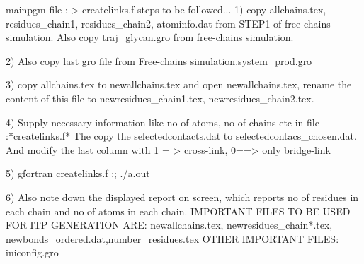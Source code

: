 mainpgm file :-> createlinks.f 
steps to be followed...
1) copy allchains.tex, residues_chain1, residues_chain2, atominfo.dat from STEP1 of free chains simulation. Also copy traj_glycan.gro from free-chains simulation.

2) Also copy last gro file from Free-chains simulation.system_prod.gro

3) copy allchains.tex to newallchains.tex and open newallchains.tex, rename the content of this file to newresidues_chain1.tex, newresidues_chain2.tex.

4) Supply necessary information like no of atoms, no of chains etc in file :*createlinks.f*
  The copy the selectedcontacts.dat to selectedcontacs_chosen.dat. And modify the last column with 1 = > cross-link, 0==> only bridge-link  

5) gfortran createlinks.f ;; ./a.out

6) Also note down the displayed report on screen, which reports no of residues in each chain and no of atoms in each chain.
  IMPORTANT FILES TO BE USED FOR ITP GENERATION ARE:
newallchains.tex, newresidues_chain*.tex, newbonds_ordered.dat,number_residues.tex
 OTHER IMPORTANT FILES:
 iniconfig.gro 
